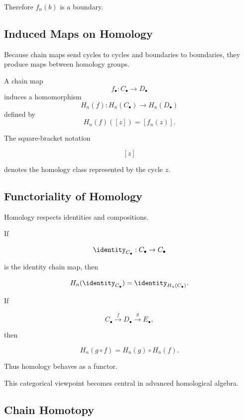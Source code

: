Therefore \(f_n(b)\) is a boundary.

\subsection{Induced Maps on Homology}
\label{subsec:induced-homology-map}

Because chain maps send cycles to cycles and boundaries to boundaries, they
produce maps between homology groups.

\begin{theorem}
A chain map
\[ f_\bullet:C_\bullet\to D_\bullet \]
induces a homomorphism
\[ H_n(f):H_n(C_\bullet)\to H_n(D_\bullet) \]
defined by
\[ H_n(f)([z])=[f_n(z)]. \]
\end{theorem}

The square-bracket notation

\[ [z] \]

denotes the homology class represented by the cycle \(z\).

\subsection{Functoriality of Homology}
\label{subsec:functoriality-homology}

Homology respects identities and compositions.

If

\[ \identity_{C_\bullet}:C_\bullet\to C_\bullet \]

is the identity chain map, then

\[ H_n(\identity_{C_\bullet})
=\identity_{H_n(C_\bullet)}. \]

If

\[ C_\bullet\xrightarrow{f}D_\bullet\xrightarrow{g}E_\bullet, \]

then

\[ H_n(g\circ f)=H_n(g)\circ H_n(f). \]

Thus homology behaves as a functor.

This categorical viewpoint becomes central in advanced homological algebra.

\subsection{Chain Homotopy}
\label{subsec:chain-homotopy}

